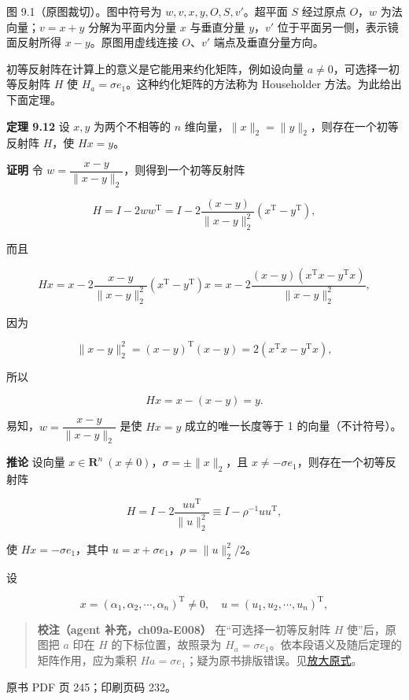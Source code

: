 图 9.1（原图裁切）。图中符号为 \(w,v,x,y,O,S,v'\)。超平面 \(S\) 经过原点 \(O\)，\(w\) 为法向量；\(v=x+y\) 分解为平面内分量 \(x\) 与垂直分量 \(y\)，\(v'\) 位于平面另一侧，表示镜面反射所得 \(x-y\)。原图用虚线连接 \(O\)、\(v'\) 端点及垂直分量方向。

初等反射阵在计算上的意义是它能用来约化矩阵，例如设向量 \(a\ne0\)，可选择一初等反射阵 \(H\) 使 \(H_a=\sigma e_1\)。这种约化矩阵的方法称为 Householder 方法。为此给出下面定理。

\textbf{定理 9.12} 设 \(x,y\) 为两个不相等的 \(n\) 维向量，\(\|x\|_2=\|y\|_2\)，则存在一个初等反射阵 \(H\)，使 \(Hx=y\)。

\textbf{证明} 令 \(w=\dfrac{x-y}{\|x-y\|_2}\)，则得到一个初等反射阵

\[
H=I-2ww^{\mathrm T}=I-2\frac{(x-y)}{\|x-y\|_2^2}(x^{\mathrm T}-y^{\mathrm T}),
\]

而且

\[
Hx=x-2\frac{x-y}{\|x-y\|_2^2}(x^{\mathrm T}-y^{\mathrm T})x=x-2\frac{(x-y)(x^{\mathrm T}x-y^{\mathrm T}x)}{\|x-y\|_2^2},
\]

因为

\[
\|x-y\|_2^2=(x-y)^{\mathrm T}(x-y)=2(x^{\mathrm T}x-y^{\mathrm T}x),
\]

所以

\[
Hx=x-(x-y)=y.
\]

易知，\(w=\dfrac{x-y}{\|x-y\|_2}\) 是使 \(Hx=y\) 成立的唯一长度等于 1 的向量（不计符号）。

\textbf{推论} 设向量 \(x\in\mathbf R^n\ (x\ne0)\)，\(\sigma=\pm\|x\|_2\)，且 \(x\ne-\sigma e_1\)，则存在一个初等反射阵

\[
H=I-2\frac{uu^{\mathrm T}}{\|u\|_2^2}\equiv I-\rho^{-1}uu^{\mathrm T},
\]

使 \(Hx=-\sigma e_1\)，其中 \(u=x+\sigma e_1\)，\(\rho=\|u\|_2^2/2\)。

设

\[
x=(\alpha_1,\alpha_2,\cdots,\alpha_n)^{\mathrm T}\ne0,\quad u=(u_1,u_2,\cdots,u_n)^{\mathrm T},
\]

\begin{quote}
\textbf{校注（agent 补充，ch09a-E008）} 在``可选择一初等反射阵 \(H\) 使''后，原图把 \(a\) 印在 \(H\) 的下标位置，故照录为 \(H_a=\sigma e_1\)。依本段语义及随后定理的矩阵作用，应为乘积 \(Ha=\sigma e_1\)；疑为原书排版错误。见\href{verified/assets/ch09a/review-p244-Ha.png}{放大原式}。
\end{quote}

\clearpage

原书 PDF 页 245；印刷页码 232。

